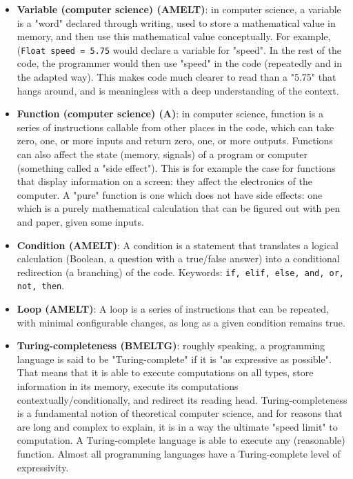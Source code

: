 \documentclass{article}
\begin{document}
\begin{itemize}
	\item \textbf{Variable (computer science) (AMELT)}: in computer science, a variable is a "word" declared through writing, used to store a mathematical value in memory, and then use this mathematical value conceptually. For example, (\texttt{Float speed = 5.75} would declare a variable for "speed". In the rest of the code, the programmer would then use "speed" in the code (repeatedly and in the adapted way). This makes code much clearer to read than a "5.75" that hangs around, and is meaningless with a deep understanding of the context.

	\item \textbf{Function (computer science) (A)}: in computer science, function is a series of instructions callable from other places in the code, which can take zero, one, or more inputs and return zero, one, or more outputs. Functions can also affect the state (memory, signals) of a program or computer (something called a "side effect"). This is for example the case for functions that display information on a screen: they affect the electronics of the computer. A "pure" function is one which does not have side effects: one which is a purely mathematical calculation that can be figured out with pen and paper, given some inputs.

	\item \textbf{Condition (AMELT)}: A condition is a statement that translates a logical calculation (Boolean, a question with a true/false answer) into a conditional redirection (a branching) of the code. Keywords: \texttt{if, elif, else, and, or, not, then}.

	\item \textbf{Loop (AMELT)}: A loop is a series of instructions that can be repeated, with minimal configurable changes, as long as a given condition remains true.

	\item \textbf{Turing-completeness (BMELTG)}: roughly speaking, a programming language is said to be "Turing-complete" if it is "as expressive as possible". That means that it is able to execute computations on all types, store information in its memory, execute its computations contextually/conditionally, and redirect its reading head. Turing-completeness is a fundamental notion of theoretical computer science, and for reasons that are long and complex to explain, it is in a way the ultimate "speed limit" to computation. A Turing-complete language is able to execute any (reasonable) function. Almost all programming languages have a Turing-complete level of expressivity.


\end{itemize}
\end{document}
